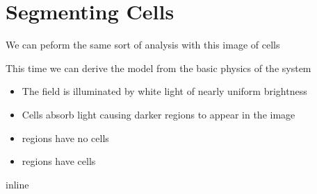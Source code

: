 \documentclass[letterpaper,10pt,english]{sphinxmanual}
\begin{document}
\chapter{Segmenting Cells}
\label{\detokenize{04-BasicSegmentation:segmenting-cells}}
\sphinxAtStartPar
We can peform the same sort of analysis with this image of cells

\sphinxAtStartPar
This time we can derive the model from the basic physics of the system
\begin{itemize}
\item {} 
\sphinxAtStartPar
The field is illuminated by white light of nearly uniform brightness

\item {} 
\sphinxAtStartPar
Cells absorb light causing darker regions to appear in the image

\item {} 
\sphinxAtStartPar
{} regions have no cells

\item {} 
\sphinxAtStartPar
{} regions have cells

\end{itemize}

\begin{sphinxVerbatim}[commandchars=\\\{\}]
 inline
   
   
   
\end{sphinxVerbatim}

\begin{sphinxVerbatim}[commandchars=\\\{\}]
  

         
 
     
\end{sphinxVerbatim}
\end{document}
